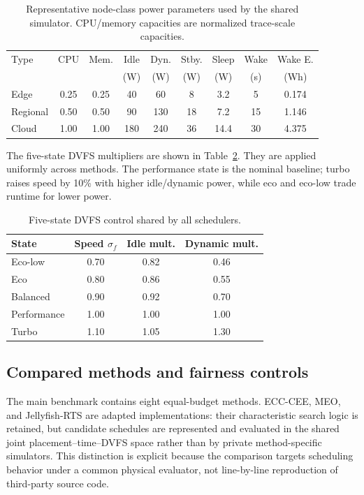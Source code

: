 \begin{table}[t]
\centering
\caption{Representative node-class power parameters used by the shared simulator. CPU/memory capacities are normalized trace-scale capacities.}
\label{tab:power-model}
\scriptsize
\setlength{\tabcolsep}{4pt}
\begin{tabular}{lcccccccc}
\toprule
Type & CPU & Mem. & Idle & Dyn. & Stby. & Sleep & Wake & Wake E. \\
 & & & (W) & (W) & (W) & (W) & (s) & (Wh) \\
\midrule
Edge & 0.25 & 0.25 & 40 & 60 & 8 & 3.2 & 5 & 0.174 \\
Regional & 0.50 & 0.50 & 90 & 130 & 18 & 7.2 & 15 & 1.146 \\
Cloud & 1.00 & 1.00 & 180 & 240 & 36 & 14.4 & 30 & 4.375 \\
\bottomrule
\end{tabular}
\end{table}

The five-state DVFS multipliers are shown in Table~\ref{tab:dvfs}. They are applied uniformly across methods. The performance state is the nominal baseline; turbo raises speed by 10\% with higher idle/dynamic power, while eco and eco-low trade runtime for lower power.

\begin{table}[t]
\centering
\caption{Five-state DVFS control shared by all schedulers.}
\label{tab:dvfs}
\small
\begin{tabular}{lccc}
\toprule
State & Speed $\sigma_f$ & Idle mult. & Dynamic mult. \\
\midrule
Eco-low & 0.70 & 0.82 & 0.46 \\
Eco & 0.80 & 0.86 & 0.55 \\
Balanced & 0.90 & 0.92 & 0.70 \\
Performance & 1.00 & 1.00 & 1.00 \\
Turbo & 1.10 & 1.05 & 1.30 \\
\bottomrule
\end{tabular}
\end{table}

\subsection{Compared methods and fairness controls}

The main benchmark contains eight equal-budget methods. ECC-CEE, MEO, and Jellyfish-RTS are adapted implementations: their characteristic search logic is retained, but candidate schedules are represented and evaluated in the shared joint placement--time--DVFS space rather than by private method-specific simulators. This distinction is explicit because the comparison targets scheduling behavior under a common physical evaluator, not line-by-line reproduction of third-party source code.

